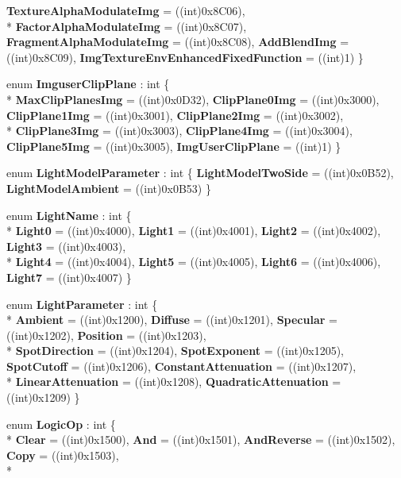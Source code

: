 \begin{DoxyCompactItemize}
{\bfseries Texture\-Alpha\-Modulate\-Img} = ((int)0x8\-C06), 
\\*
{\bfseries Factor\-Alpha\-Modulate\-Img} = ((int)0x8\-C07), 
{\bfseries Fragment\-Alpha\-Modulate\-Img} = ((int)0x8\-C08), 
{\bfseries Add\-Blend\-Img} = ((int)0x8\-C09), 
{\bfseries Img\-Texture\-Env\-Enhanced\-Fixed\-Function} = ((int)1)
 \}
\item 
enum {\bfseries Imguser\-Clip\-Plane} \-: int \{ \\*
{\bfseries Max\-Clip\-Planes\-Img} = ((int)0x0\-D32), 
{\bfseries Clip\-Plane0\-Img} = ((int)0x3000), 
{\bfseries Clip\-Plane1\-Img} = ((int)0x3001), 
{\bfseries Clip\-Plane2\-Img} = ((int)0x3002), 
\\*
{\bfseries Clip\-Plane3\-Img} = ((int)0x3003), 
{\bfseries Clip\-Plane4\-Img} = ((int)0x3004), 
{\bfseries Clip\-Plane5\-Img} = ((int)0x3005), 
{\bfseries Img\-User\-Clip\-Plane} = ((int)1)
 \}
\item 
enum {\bfseries Light\-Model\-Parameter} \-: int \{ {\bfseries Light\-Model\-Two\-Side} = ((int)0x0\-B52), 
{\bfseries Light\-Model\-Ambient} = ((int)0x0\-B53)
 \}
\item 
enum {\bfseries Light\-Name} \-: int \{ \\*
{\bfseries Light0} = ((int)0x4000), 
{\bfseries Light1} = ((int)0x4001), 
{\bfseries Light2} = ((int)0x4002), 
{\bfseries Light3} = ((int)0x4003), 
\\*
{\bfseries Light4} = ((int)0x4004), 
{\bfseries Light5} = ((int)0x4005), 
{\bfseries Light6} = ((int)0x4006), 
{\bfseries Light7} = ((int)0x4007)
 \}
\item 
enum {\bfseries Light\-Parameter} \-: int \{ \\*
{\bfseries Ambient} = ((int)0x1200), 
{\bfseries Diffuse} = ((int)0x1201), 
{\bfseries Specular} = ((int)0x1202), 
{\bfseries Position} = ((int)0x1203), 
\\*
{\bfseries Spot\-Direction} = ((int)0x1204), 
{\bfseries Spot\-Exponent} = ((int)0x1205), 
{\bfseries Spot\-Cutoff} = ((int)0x1206), 
{\bfseries Constant\-Attenuation} = ((int)0x1207), 
\\*
{\bfseries Linear\-Attenuation} = ((int)0x1208), 
{\bfseries Quadratic\-Attenuation} = ((int)0x1209)
 \}
\item 
enum {\bfseries Logic\-Op} \-: int \{ \\*
{\bfseries Clear} = ((int)0x1500), 
{\bfseries And} = ((int)0x1501), 
{\bfseries And\-Reverse} = ((int)0x1502), 
{\bfseries Copy} = ((int)0x1503), 
\\*

\end{DoxyCompactItemize}
